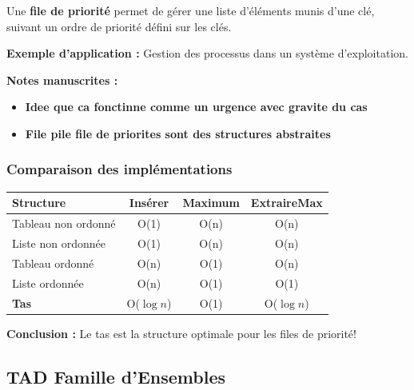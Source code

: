 \documentclass[12pt,a4paper]{article}
\begin{document}
\begin{definition}
Une \textbf{file de priorité} permet de gérer une liste d'éléments munis d'une clé, suivant un ordre de priorité défini sur les clés.

\textbf{Exemple d'application :} Gestion des processus dans un système d'exploitation.
\end{definition}

\begin{notecours}
\textbf{Notes manuscrites :}
\begin{itemize}
    \item \textbf{Idee que ca fonctinne comme un urgence avec gravite du cas}
    \item \textbf{File pile file de priorites sont des structures abstraites}
\end{itemize}
\end{notecours}

\subsubsection{Comparaison des implémentations}

\begin{center}
\colorbox{fondbleu}{
\begin{tabular}{|l|c|c|c|}
\hline
\rowcolor{titrebleu!30}
\textbf{Structure} & \textbf{Insérer} & \textbf{Maximum} & \textbf{ExtraireMax} \\
\hline
Tableau non ordonné & \textcolor{defvert}{O(1)} & O(n) & O(n) \\
Liste non ordonnée & \textcolor{defvert}{O(1)} & O(n) & O(n) \\
Tableau ordonné & O(n) & \textcolor{defvert}{O(1)} & O(n) \\
Liste ordonnée & O(n) & \textcolor{defvert}{O(1)} & \textcolor{defvert}{O(1)} \\
\rowcolor{defvert!20}
\textbf{Tas} & \textcolor{algoviolet}{O($\log n$)} & \textcolor{defvert}{O(1)} & \textcolor{algoviolet}{O($\log n$)} \\
\hline
\end{tabular}}
\end{center}

\begin{important}
\textbf{Conclusion :} Le tas est la structure optimale pour les files de priorité!
\end{important}

\subsection{TAD Famille d'Ensembles}
\end{document}
